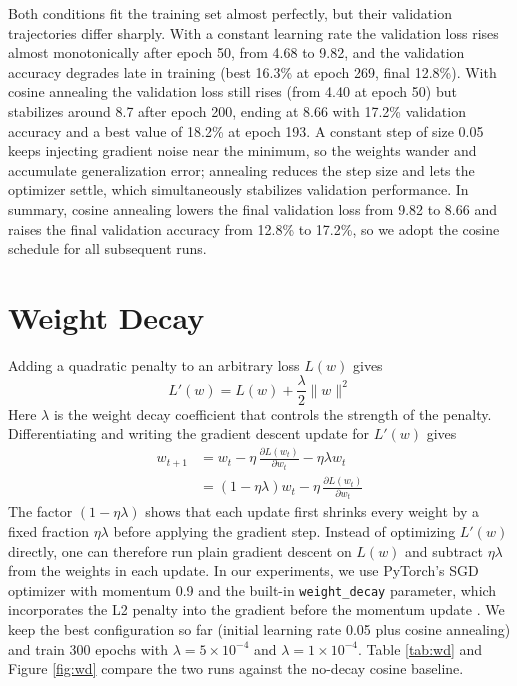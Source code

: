 \documentclass[letterpaper]{article} %
\begin{document}
Both conditions fit the training set almost perfectly, but their validation
trajectories differ sharply.  With a constant learning rate the validation
loss rises almost monotonically after epoch 50, from 4.68 to 9.82, and the
validation accuracy degrades late in training (best 16.3\% at epoch 269, final
12.8\%).  With cosine annealing the validation loss still rises (from 4.40 at
epoch 50) but stabilizes around 8.7 after epoch 200, ending at 8.66 with
17.2\% validation accuracy and a best value of 18.2\% at epoch 193.  A
constant step of size 0.05 keeps injecting gradient noise near the minimum,
so the weights wander and accumulate generalization error; annealing reduces
the step size and lets the optimizer settle, which simultaneously stabilizes
validation performance.  In summary, cosine annealing lowers the final
validation loss from 9.82 to 8.66 and raises the final validation accuracy
from 12.8\% to 17.2\%, so we adopt the cosine schedule for all subsequent
runs.

\section{Weight Decay}

Adding a quadratic penalty to an arbitrary loss $L(w)$ gives
\begin{equation}
L'(w) = L(w) + \frac{\lambda}{2}\|w\|^2 
\end{equation}
Here $\lambda$ is the weight decay coefficient that controls the strength of the
penalty. Differentiating and writing the gradient descent update for
$L'(w)$ gives
\begin{eqnarray*}
w_{t+1} &= w_t - \eta\,\frac{\partial L(w_t)}{\partial w_t}
- \eta\lambda w_t \\
&= \left(1 - \eta\lambda\right) w_t
- \eta\,\frac{\partial L(w_t)}{\partial w_t} 
\end{eqnarray*}
The factor $(1-\eta\lambda)$ shows that each update first shrinks
every weight by a fixed fraction $\eta\lambda$ before applying the gradient
step.  Instead of optimizing $L'(w)$ directly, one can therefore run plain
gradient descent on $L(w)$ and subtract $\eta\lambda $ from the weights in
each update. In our experiments, we use PyTorch's SGD optimizer with 
momentum 0.9 and the built-in \texttt{weight\_decay} parameter,
which incorporates the L2 penalty into the gradient before the momentum update
\cite{zhang2019three}.
We keep the best configuration so far (initial learning rate 0.05 plus cosine
annealing) and train 300 epochs with $\lambda=5\times10^{-4}$ and
$\lambda=1\times10^{-4}$.  Table \ref{tab:wd} and Figure \ref{fig:wd} compare
the two runs against the no-decay cosine baseline.
\end{document}
